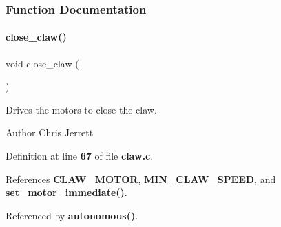 \subsubsection{Function Documentation}
\mbox{\label{claw_8c_ac42dd40dbb37219295286859c6b068c2}} 
\paragraph{close\+\_\+claw()}
{\footnotesize\ttfamily void close\+\_\+claw (\begin{DoxyParamCaption}{ }\end{DoxyParamCaption})}



Drives the motors to close the claw. 

\begin{DoxyAuthor}{Author}
Chris Jerrett 
\end{DoxyAuthor}


Definition at line \textbf{ 67} of file \textbf{ claw.\+c}.



References \textbf{ C\+L\+A\+W\+\_\+\+M\+O\+T\+OR}, \textbf{ M\+I\+N\+\_\+\+C\+L\+A\+W\+\_\+\+S\+P\+E\+ED}, and \textbf{ set\+\_\+motor\+\_\+immediate()}.



Referenced by \textbf{ autonomous()}.


